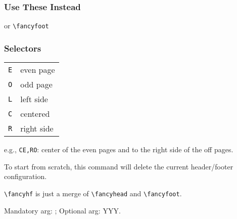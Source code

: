 \documentclass[a4paper]{article}
\newcommand{\ex}[2][YYY]{Mandatory arg: #2;
                         Optional arg: #1.}
\begin{document}
\subsubsection*{Use These Instead}

\rule{0em}{2ex}

 or \verb|\fancyfoot|

\subsubsection*{Selectors}
\begin{tabular}{c @{~~~~~~~~} l}
\verb|E|    &   even page       \\
\verb|O|    &   odd page        \\
\verb|L|    &   left side       \\
\verb|C|    &   centered        \\
\verb|R|    &   right side
\end{tabular}

\rule{0em}{2ex}

e.g., \verb|CE,RO|: center of the even pages and to the right side of the off pages.

\rule{0em}{2ex}

To start from scratch, this command will delete the current header/footer configuration.

\rule{0em}{2ex}


\rule{0em}{2ex}

\verb|\fancyhf| is just a merge of \verb|\fancyhead| and \verb|\fancyfoot|.

\rule{0em}{2ex}


\ex

\printindex
\end{document}
